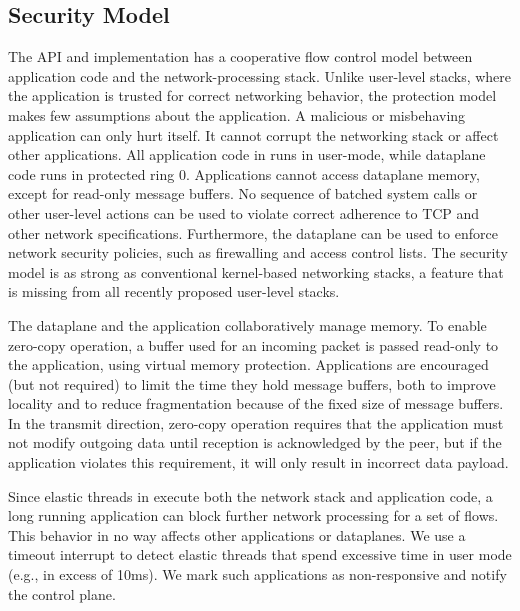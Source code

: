 \subsection{Security Model}
\label{sec:impl:coop}


The \ix API and implementation has a cooperative flow control
model between application code and the network-processing stack.
Unlike user-level stacks, where the application is trusted for correct
networking behavior, the \ix protection model makes few assumptions about the
application. A malicious or misbehaving application can only hurt
itself. It cannot corrupt the networking stack or affect other
applications. All application code in \ix runs in user-mode, while
dataplane code runs in protected ring 0. Applications cannot access
dataplane memory, except for read-only message buffers.  No sequence
of batched system calls or other user-level actions can be used to
violate correct adherence to TCP and other network specifications.
Furthermore, the dataplane can be used to enforce network security
policies, such as firewalling and access control lists.
The \ix security model is as strong as
conventional kernel-based networking stacks, a feature that is missing
from all recently proposed user-level stacks.

The \ix dataplane and the application collaboratively manage
memory. To enable zero-copy operation, a buffer used for an incoming
packet is passed read-only to the application, using virtual memory protection.
Applications are encouraged (but not required) to limit the time they hold message buffers,
both to improve locality and to reduce fragmentation because of the fixed
size of message buffers.  In the
transmit direction, zero-copy operation requires that the application
must not modify outgoing data until reception is acknowledged by the
peer, but if the application violates this requirement, it will
only result in incorrect data payload.

Since elastic threads in \ix execute both the network stack and
application code, a long running application can block further network
processing for a set of flows. This behavior in no way affects other
applications or dataplanes. We use a timeout interrupt to detect
elastic threads that spend excessive time in user mode (e.g., in
excess of 10ms). We mark such applications as non-responsive and
notify the control plane.

